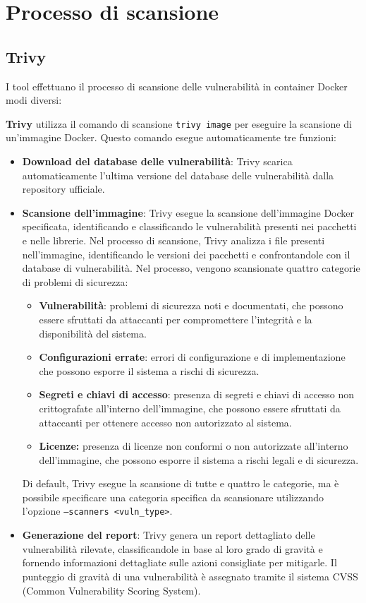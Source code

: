 \section{Processo di scansione}
\subsection{Trivy}
I tool effettuano il processo di scansione delle vulnerabilità in container Docker modi diversi:

\textbf{Trivy} utilizza il comando di scansione \texttt{trivy image} per eseguire la scansione di un'immagine Docker. Questo comando esegue automaticamente tre funzioni:
\begin{itemize}
   \item \textbf{Download del database delle vulnerabilità}: Trivy scarica automaticamente l'ultima versione del database delle vulnerabilità dalla repository ufficiale.
   \item \textbf{Scansione dell'immagine}: Trivy esegue la scansione dell'immagine Docker specificata, identificando e classificando le vulnerabilità presenti nei pacchetti e nelle librerie. Nel processo di scansione, Trivy analizza i file presenti nell'immagine, identificando le versioni dei pacchetti e confrontandole con il database di vulnerabilità. Nel processo, vengono scansionate quattro categorie di problemi di sicurezza:
         \begin{itemize}
            \item \textbf{Vulnerabilità}: problemi di sicurezza noti e documentati, che possono essere sfruttati da attaccanti per compromettere l'integrità e la disponibilità del sistema.
            \item \textbf{Configurazioni errate}: errori di configurazione e di implementazione che possono esporre il sistema a rischi di sicurezza.
            \item \textbf{Segreti e chiavi di accesso}: presenza di segreti e chiavi di accesso non crittografate all'interno dell'immagine, che possono essere sfruttati da attaccanti per ottenere accesso non autorizzato al sistema.
            \item \textbf{Licenze:} presenza di licenze non conformi o non autorizzate all'interno dell'immagine, che possono esporre il sistema a rischi legali e di sicurezza.
         \end{itemize}
         Di default, Trivy esegue la scansione di tutte e quattro le categorie, ma è possibile specificare una categoria specifica da scansionare utilizzando l'opzione \texttt{--scanners <vuln\_type>}.

   \item \textbf{Generazione del report}: Trivy genera un report dettagliato delle vulnerabilità rilevate, classificandole in base al loro grado di gravità e fornendo informazioni dettagliate sulle azioni consigliate per mitigarle. Il punteggio di gravità di una vulnerabilità è assegnato tramite il sistema CVSS (Common Vulnerability Scoring System).
\end{itemize}
